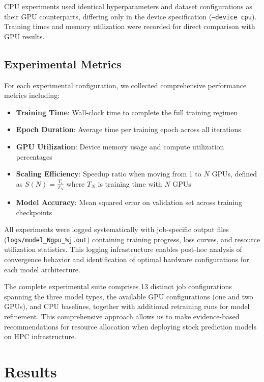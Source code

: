\documentclass[sigconf]{acmart}
\begin{document}
CPU experiments used identical hyperparameters and dataset configurations as their GPU counterparts, differing only in the device specification (\texttt{--device cpu}). Training times and memory utilization were recorded for direct comparison with GPU results.

\subsection{Experimental Metrics}

For each experimental configuration, we collected comprehensive performance metrics including:

\begin{itemize}
  \item \textbf{Training Time}: Wall-clock time to complete the full training regimen
  \item \textbf{Epoch Duration}: Average time per training epoch across all iterations
  \item \textbf{GPU Utilization}: Device memory usage and compute utilization percentages
  \item \textbf{Scaling Efficiency}: Speedup ratio when moving from 1 to $N$ GPUs, defined as $S(N) = \frac{T_1}{T_N}$ where $T_N$ is training time with $N$ GPUs
  \item \textbf{Model Accuracy}: Mean squared error on validation set across training checkpoints
\end{itemize}

All experiments were logged systematically with job-specific output files (\texttt{logs/model\_Ngpu\_\%j.out}) containing training progress, loss curves, and resource utilization statistics. This logging infrastructure enables post-hoc analysis of convergence behavior and identification of optimal hardware configurations for each model architecture.

The complete experimental suite comprises 13 distinct job configurations spanning the three model types, the available GPU configurations (one and two GPUs), and CPU baselines, together with additional retraining runs for model refinement. This comprehensive approach allows us to make evidence-based recommendations for resource allocation when deploying stock prediction models on HPC infrastructure.

\section{Results}
\end{document}
